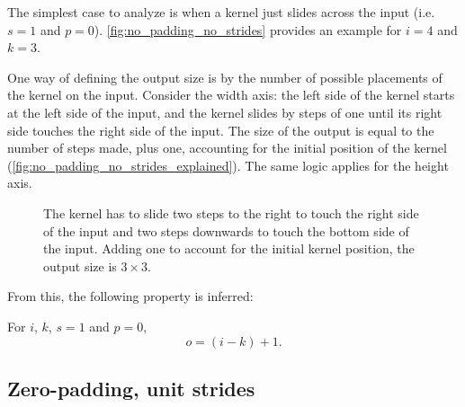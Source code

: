 \documentclass{article}
\begin{document}
The simplest case to analyze is when a kernel just slides across the input (i.e.
$s = 1$ and $p = 0$). \autoref{fig:no_padding_no_strides} provides an example
for $i = 4$ and $k = 3$.

One way of defining the output size is by the number of possible placements of
the kernel on the input. Consider the width axis: the left side of the kernel
starts at the left side of the input, and the kernel slides by steps of one
until its right side touches the right side of the input. The size of the output
is equal to the number of steps made, plus one, accounting for the initial
position of the kernel (\autoref{fig:no_padding_no_strides_explained}). The same
logic applies for the height axis.

\begin{figure}[h]
    \centering
    \caption{\label{fig:no_padding_no_strides_explained} The kernel has to slide
        two steps to the right to touch the right side of the input and two
        steps downwards to touch the bottom side of the input. Adding one to
        account for the initial kernel position, the output size is $3 \times
        3$.}
\end{figure}

From this, the following property is inferred:

\begin{prop}\label{prop:no_padding_no_strides}
For $i$, $k$, $s = 1$ and $p = 0$,
\begin{equation*}
    o = (i - k) + 1.
\end{equation*}
\end{prop}

\subsection{Zero-padding, unit strides}
\end{document}
